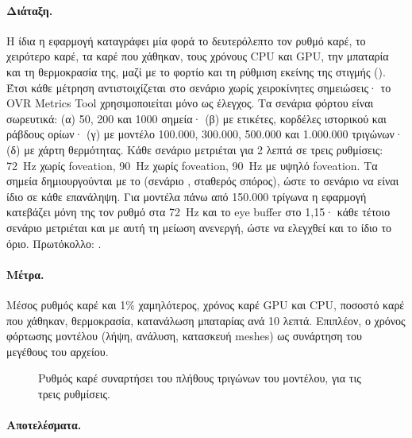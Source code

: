 \paragraph{Διάταξη.} Η ίδια η εφαρμογή καταγράφει μία φορά το δευτερόλεπτο τον ρυθμό καρέ, το χειρότερο καρέ, τα καρέ που χάθηκαν, τους χρόνους CPU και GPU, την μπαταρία και τη θερμοκρασία της, μαζί με το φορτίο και τη ρύθμιση εκείνης της στιγμής (). Έτσι κάθε μέτρηση αντιστοιχίζεται στο σενάριο χωρίς χειροκίνητες σημειώσεις· το OVR Metrics Tool χρησιμοποιείται μόνο ως έλεγχος. Τα σενάρια φόρτου είναι σωρευτικά:
(α) 50, 200 και 1000 σημεία·
(β) με ετικέτες, κορδέλες ιστορικού και ράβδους ορίων·
(γ) με μοντέλο 100.000, 300.000, 500.000 και 1.000.000 τριγώνων·
(δ) με χάρτη θερμότητας.
Κάθε σενάριο μετριέται για 2 λεπτά σε τρεις ρυθμίσεις: \SI{72}{Hz} χωρίς foveation, \SI{90}{Hz} χωρίς foveation, \SI{90}{Hz} με υψηλό foveation. Τα σημεία δημιουργούνται με το  (σενάριο , σταθερός σπόρος), ώστε το σενάριο να είναι ίδιο σε κάθε επανάληψη. Για μοντέλα πάνω από 150.000 τρίγωνα η εφαρμογή κατεβάζει μόνη της τον ρυθμό στα \SI{72}{Hz} και το eye buffer στο 1,15· κάθε τέτοιο σενάριο μετριέται και με αυτή τη μείωση ανενεργή, ώστε να ελεγχθεί και το ίδιο το όριο. Πρωτόκολλο: .

\paragraph{Μέτρα.} Μέσος ρυθμός καρέ και 1\% χαμηλότερος, χρόνος καρέ GPU και CPU, ποσοστό καρέ που χάθηκαν, θερμοκρασία, κατανάλωση μπαταρίας ανά 10 λεπτά. Επιπλέον, ο χρόνος φόρτωσης μοντέλου (λήψη, ανάλυση, κατασκευή meshes) ως συνάρτηση του μεγέθους του αρχείου.

\begin{figure}[htbp]
  \centering
  \caption{Ρυθμός καρέ συναρτήσει του πλήθους τριγώνων του μοντέλου, για τις τρεις ρυθμίσεις.}
  \label{fig:fps-triangles}
\end{figure}

\paragraph{Αποτελέσματα.}\mbox{}


